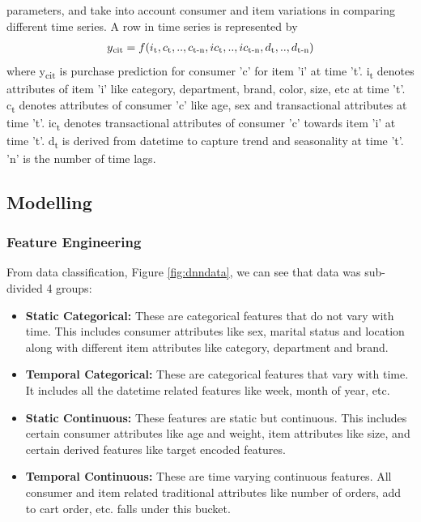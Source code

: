 parameters, and take into account consumer and item variations in comparing different time series. A row 
in time series is represented by
  \begin{equation}
    \begin{array}{l}
      y\textsubscript{cit}  = f(i\textsubscript{t}, c\textsubscript{t},..,c\textsubscript{t-n}, ic\textsubscript{t}
      ,..,ic\textsubscript{t-n}, d\textsubscript{t},..,d\textsubscript{t-n})
    \end{array}
    \label{eqn:fx}
  \end{equation}
where y\textsubscript{cit} is purchase prediction for consumer 'c' for item ’i’ at time ’t’. 
i\textsubscript{t} denotes attributes of item ’i’ like category, department, brand, color, size, etc at time 't'. 
c\textsubscript{t} denotes attributes of consumer 'c' like age, sex and transactional attributes at time 't'. 
ic\textsubscript{t} denotes transactional attributes of consumer 'c'  towards item 'i' at time 't'. 
d\textsubscript{t} is derived from datetime to capture trend and seasonality at time 't'. 
'n' is the number of time lags.

\subsection{Modelling}
\subsubsection{Feature Engineering}
From data classification, Figure \ref{fig:dnndata}, we can see that data was sub-divided 4 groups:
\begin{itemize}
\item {\bf Static Categorical:} These are categorical features that do not vary with time. This includes consumer
attributes like sex, marital status and location along with different item attributes like category, department and brand.
\item {\bf Temporal Categorical:} These are categorical features that vary with time. It includes all the datetime 
related features like week, month of year, etc.
\item {\bf Static Continuous:} These features are static but continuous. This includes certain consumer attributes like
age and weight, item attributes like size, and certain derived features like target encoded features.
\item {\bf Temporal Continuous:} These are time varying continuous features. All consumer and item related
traditional attributes like number of orders, add to cart order, etc. falls under this bucket.
\end{itemize}
